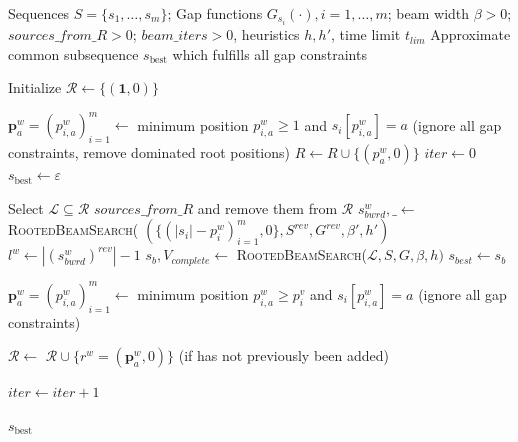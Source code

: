 \documentclass[runningheads]{llncs}
\begin{document}
\begin{algorithm}[H]
	\caption{Iterative Multi-source Beam Search (IMSBS) Framework }
	\label{alg:imbs}
	\begin{algorithmic}[1]
		\Require Sequences $S=\{s_1, \dots, s_m\}$; Gap functions $G_{s_i}(\cdot),i=1,\ldots,m$; beam width $\beta>0$; ${sources\_from\_R}>0$; $beam\_iters>0$, heuristics $h, h'$, time limit $t_{{lim}}$
		\Ensure Approximate common subsequence $s_{\textrm{best}}$ which fulfills all gap constraints
		
		\State Initialize $\mathcal{R} \gets \{ (\mathbf{1},0) \}$ 
		
		
		 
		\State $\textbf{p}^w_{a} = ({p}^w_{i, a})_{i=1}^m \gets$ minimum position  $p^w_{i, a} \geq 1$ and $s_i[p^w_{i, a}] = a$ (ignore all gap constraints, remove dominated root positions)
		\State $R \gets R \cup \{ (p^w_a, 0)\}$
		\EndFor
		\State $iter \gets 0$
		\State $s_{\textrm{best}} \gets  \varepsilon$
		
		\State Select $\mathcal{L} \subseteq \mathcal{R}$  ${sources\_from\_R}$  and remove them from $\mathcal{R}$ 
		\State $s_{bwrd}^w, \_ \gets$ 
		\textsc{RootedBeamSearch}(  
		$(\{ (|s_i| - p^w_i)_{i=1}^m, 0\}, S^{rev}, G^{rev}, \beta', h')$
		\State  $l^w \gets |(s_{bwrd}^w)^{rev}|-1$  
		\EndFor
		\State $s_{b}, V_{complete}
		\gets$ 
		\textsc{RootedBeamSearch}($\mathcal{L}, S, G, \beta, h)$ 
		\State $s_{best} \gets s_b$
		\EndIf
		
		
		 
		\State $\textbf{p}^w_{a}= ({p}^w_{i, a})_{i=1}^m \gets$ minimum position  $p^w_{i, a} \geq {p}_i^v$ and $s_i[p^w_{i, a}] = a$ (ignore all gap constraints)
		
		\State $\mathcal{R} \gets$ $\mathcal{R} \cup \{r^w = (\textbf{p}^w_a, 0)\}$   (if has not previously been  added) 
		\EndFor
		\EndFor
		
		\State $iter \gets iter + 1$
		\EndWhile
		
		\State \Return $s_{\textrm{best}}$
	\end{algorithmic}
\end{algorithm}
\end{document}
